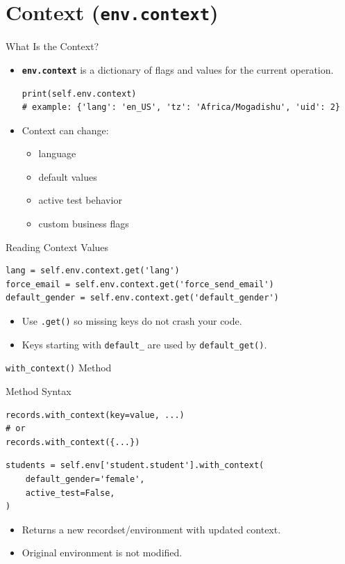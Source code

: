 \section{Context (\texttt{env.context})}

\begin{frame}[fragile]{What Is the Context?}
	\begin{itemize}
		\item \textbf{\texttt{env.context}} is a dictionary of flags and values for the current operation.
\begin{lstlisting}
print(self.env.context)
# example: {'lang': 'en_US', 'tz': 'Africa/Mogadishu', 'uid': 2}
\end{lstlisting}
		\item Context can change:
		\begin{itemize}
			\item language
			\item default values
			\item active test behavior
			\item custom business flags
		\end{itemize}
	\end{itemize}
\end{frame}

\begin{frame}[fragile]{Reading Context Values}
\begin{lstlisting}
lang = self.env.context.get('lang')
force_email = self.env.context.get('force_send_email')
default_gender = self.env.context.get('default_gender')
\end{lstlisting}
	\begin{itemize}
		\item Use \texttt{.get()} so missing keys do not crash your code.
		\item Keys starting with \texttt{default\_} are used by \texttt{default\_get()}.
	\end{itemize}
\end{frame}

\begin{frame}[fragile]{\texttt{with\_context()} Method}
\begin{block}{Method Syntax}
\begin{lstlisting}
records.with_context(key=value, ...)
# or
records.with_context({...})
\end{lstlisting}
\end{block}
\begin{lstlisting}
students = self.env['student.student'].with_context(
	default_gender='female',
	active_test=False,
)
\end{lstlisting}
	\begin{itemize}
		\item Returns a new recordset/environment with updated context.
		\item Original environment is not modified.
	\end{itemize}
\end{frame}

